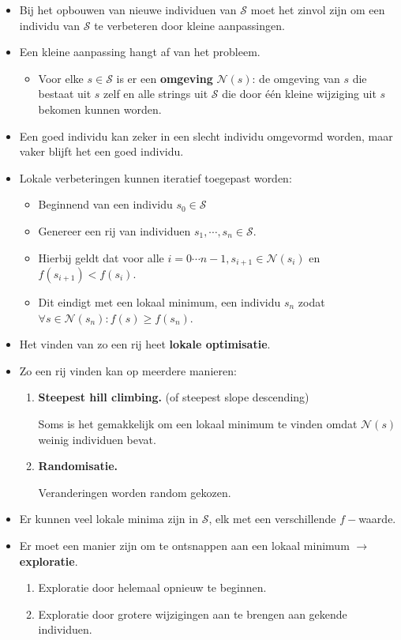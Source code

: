 \begin{itemize}
    \item Bij het opbouwen van nieuwe  individuen van $\mathcal{S}$ moet het zinvol zijn om een individu van $\mathcal{S}$ te verbeteren door kleine aanpassingen.
    \item Een kleine aanpassing hangt af van het probleem.
    \begin{itemize}
        \item Voor elke $s \in \mathcal{S}$ is er een \textbf{omgeving} $\mathcal{N}(s)$: de omgeving van $s$ die bestaat uit $s$ zelf en alle strings uit $\mathcal{S}$ die door één kleine wijziging uit $s$ bekomen kunnen worden.
    \end{itemize}  
    \item Een goed individu kan zeker in een slecht individu omgevormd worden, maar vaker blijft het een goed individu.
    \item Lokale verbeteringen kunnen iteratief toegepast worden:
    \begin{itemize}
        \item Beginnend van een individu $s_0 \in \mathcal{S}$
        \item Genereer een rij van individuen $s_1, \cdots , s_n \in \mathcal{S}$.
        \item Hierbij geldt dat voor alle $i = 0  \cdots n-1, s_{i+1} \in \mathcal{N}(s_i)$ en $f(s_{i + 1}) < f(s_i)$. 
        \item Dit eindigt met een lokaal minimum, een individu $s_n$ zodat $\forall s \in \mathcal{N}(s_n): f(s) \geq f(s_n)$.
    \end{itemize}
    \item Het vinden van zo een rij heet \textbf{lokale optimisatie}.
    \item Zo een rij vinden kan op meerdere manieren:
    \begin{enumerate}
        \item \textbf{Steepest hill climbing.} (of steepest slope descending)

        Soms is het gemakkelijk om een lokaal minimum te vinden omdat $\mathcal{N}(s)$ weinig individuen bevat.

        \item \textbf{Randomisatie.}

        Veranderingen worden random gekozen.
    \end{enumerate}

    \item Er kunnen veel lokale minima zijn in $\mathcal{S}$, elk met een verschillende $f-$waarde.
    \item Er moet een manier zijn om te ontsnappen aan een lokaal minimum $\rightarrow$ \textbf{exploratie}.
    \begin{enumerate}
        \item Exploratie door helemaal opnieuw te beginnen.
        \item Exploratie door grotere wijzigingen aan te brengen aan gekende individuen.
    \end{enumerate}
\end{itemize}

